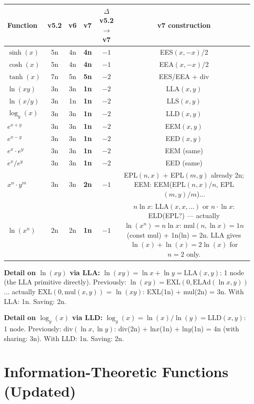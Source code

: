 \documentclass[11pt]{article}
\newcommand{\imp}[1]{\textcolor{imp}{\textbf{#1}}}
\begin{document}
\begin{center}
\begin{tabular}{lccccc}
\toprule
Function & v5.2 & v6 & v7 & $\Delta$ v5.2$\to$v7 & v7 construction \\
\midrule
$\sinh(x)$       & 5n & 4n & \imp{4n} & $-1$ & EES$(x,-x)$/2 \\
$\cosh(x)$       & 5n & 4n & \imp{4n} & $-1$ & EEA$(x,-x)$/2 \\
$\tanh(x)$       & 7n & 5n & \imp{5n} & $-2$ & EES/EEA + div \\
$\ln(xy)$        & 3n & 3n & \imp{1n} & $-2$ & LLA$(x,y)$ \\
$\ln(x/y)$       & 3n & 1n & \imp{1n} & $-2$ & LLS$(x,y)$ \\
$\log_y(x)$      & 3n & 3n & \imp{1n} & $-2$ & LLD$(x,y)$ \\
$e^{x+y}$        & 3n & 3n & \imp{1n} & $-2$ & EEM$(x,y)$ \\
$e^{x-y}$        & 3n & 3n & \imp{1n} & $-2$ & EED$(x,y)$ \\
$e^x \cdot e^y$  & 3n & 3n & \imp{1n} & $-2$ & EEM (same) \\
$e^x / e^y$      & 3n & 3n & \imp{1n} & $-2$ & EED (same) \\
$x^n \cdot y^m$  & 3n & 3n & \imp{2n} & $-1$ & EPL$(n,x)$ + EPL$(m,y)$ already 2n; EEM: EEM(EPL$(n,x)/n$, EPL$(m,y)/m$)... \\
$\ln(x^n)$       & 2n & 2n & \imp{1n} & $-1$ & $n \ln x$: LLA$(x,x,\ldots)$ or $n \cdot \ln x$: ELD(EPL?) — actually $\ln(x^n) = n \ln x$: mul$(n, \ln x) = 1n$ (const mul) + 1n(ln) = 2n. LLA gives $\ln(x)+\ln(x) = 2\ln(x)$ for $n=2$ only. \\
\bottomrule
\end{tabular}
\end{center}

\noindent \textbf{Detail on $\ln(xy)$ via LLA:}
$\ln(xy) = \ln x + \ln y = \mathrm{LLA}(x,y)$: 1 node (the LLA primitive directly).
Previously: $\ln(xy) = \mathrm{EXL}(0, \mathrm{ELAd}(\ln x, y))$... actually
$\mathrm{EXL}(0, \mathrm{mul}(x,y))$ = $\ln(xy)$: EXL(1n) + mul(2n) = 3n.
With LLA: 1n. Saving: 2n.

\noindent \textbf{Detail on $\log_y(x)$ via LLD:}
$\log_y(x) = \ln(x)/\ln(y) = \mathrm{LLD}(x,y)$: 1 node.
Previously: $\mathrm{div}(\ln x, \ln y)$: div(2n) + ln$x$(1n) + ln$y$(1n) = 4n (with sharing: 3n).
With LLD: 1n. Saving: 2n.

\section{Information-Theoretic Functions (Updated)}
\label{sec:info}
\end{document}
